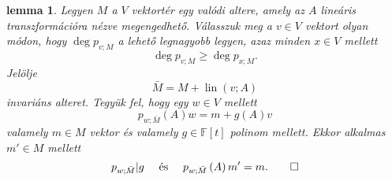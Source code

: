 \documentclass[9pt, a4paper, showtrims]{memoir}
\theoremstyle{plain}
\newtheorem{lemma}[proposition]{lemma}
\theoremstyle{remark}
\theoremstyle{definition}
\DeclareMathOperator{\lin}{lin}
\begin{document}
\begin{lemma}
    Legyen $M$ a $V$ vektortér egy valódi altere, 
    amely az $A$ lineáris transzformációra nézve megengedhető.
    Válasszuk meg a $v\in V$ vektort olyan módon, hogy $\deg p_{v;M}$ a lehető legnagyobb legyen,
    azaz minden $x\in V$ mellett
    \[
        \deg p_{v;M}
        \geq
        \deg p_{x;M}.
    \]
    Jelölje 
    \[
        \bar{M}
        =
        M+\lin\left( v;A \right)
    \]
    invariáns alteret.
    Tegyük fel, hogy egy $w\in V$ mellett 
    \[
        p_{w;\bar{M}}\left( A \right)w
        =
        m+g\left( A \right)v
        \tag{\dag}
    \]
    valamely $m\in M$ vektor és valamely $g\in\mathbb{F}\left[ t \right]$ polinom mellett.
    Ekkor alkalmas $m'\in M$ mellett
    \[
        p_{w;\bar{M}}|g 
        \quad\text{ és }\quad
        p_{w;\bar{M}}\left( A \right)m'=m.
        \qedhere
    \]
    \label{le:megengedhetolepes}
\end{lemma}
\end{document}
